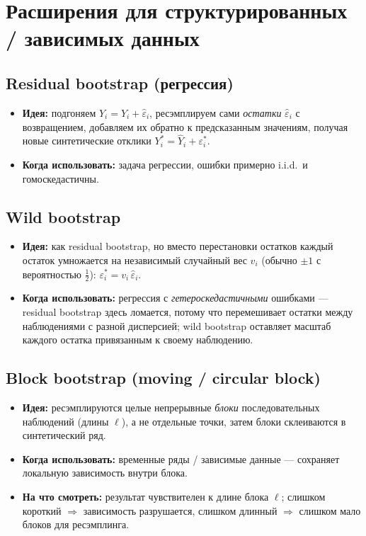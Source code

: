 \documentclass[11pt]{article}
\begin{document}
\section{Расширения для структурированных / зависимых данных}

\subsection*{Residual bootstrap (регрессия)}
\begin{itemize}
  \item \textbf{Идея:} подгоняем $Y_i = \hat Y_i + \hat\varepsilon_i$, ресэмплируем сами \emph{остатки} $\hat\varepsilon_i$ с возвращением, добавляем их обратно к предсказанным значениям, получая новые синтетические отклики $Y_i^* = \hat Y_i + \varepsilon_i^*$.
  \item \textbf{Когда использовать:} задача регрессии, ошибки примерно i.i.d.\ и гомоскедастичны.
\end{itemize}

\subsection*{Wild bootstrap}
\begin{itemize}
  \item \textbf{Идея:} как residual bootstrap, но вместо перестановки остатков каждый остаток умножается на независимый случайный вес $v_i$ (обычно $\pm1$ с вероятностью $\tfrac12$): $\varepsilon_i^* = v_i\,\hat\varepsilon_i$.
  \item \textbf{Когда использовать:} регрессия с \emph{гетероскедастичными} ошибками --- residual bootstrap здесь ломается, потому что перемешивает остатки между наблюдениями с разной дисперсией; wild bootstrap оставляет масштаб каждого остатка привязанным к своему наблюдению.
\end{itemize}

\subsection*{Block bootstrap (moving / circular block)}
\begin{itemize}
  \item \textbf{Идея:} ресэмплируются целые непрерывные \emph{блоки} последовательных наблюдений (длины $\ell$), а не отдельные точки, затем блоки склеиваются в синтетический ряд.
  \item \textbf{Когда использовать:} временные ряды / зависимые данные --- сохраняет локальную зависимость внутри блока.
  \item \textbf{На что смотреть:} результат чувствителен к длине блока $\ell$; слишком короткий $\Rightarrow$ зависимость разрушается, слишком длинный $\Rightarrow$ слишком мало блоков для ресэмплинга.
\end{itemize}
\end{document}
